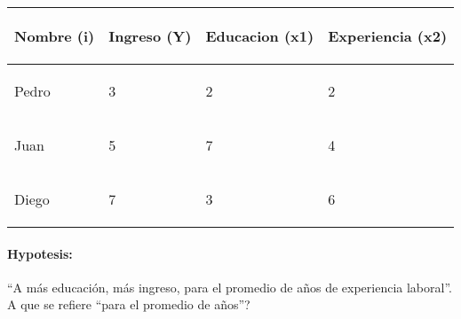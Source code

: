 \documentclass[10pt]{article}
\begin{document}
\begin{table}[!h]
        \centering
        
\begin{tabular}{|p{}|p{}|p{}|p{}|}
\hline 
 \begin{center}
\textbf{Nombre (i)}
\end{center}
 & \begin{center}
\textbf{Ingreso (Y)}
\end{center}
 & \begin{center}
\textbf{Educacion (x1)}
\end{center}
 & \begin{center}
\textbf{Experiencia (x2)}
\end{center}
 \\
\hline 
 \begin{center}
Pedro
\end{center}
 & \begin{center}
3
\end{center}
 & \begin{center}
2
\end{center}
 & \begin{center}
2
\end{center}
 \\
\hline 
 \begin{center}
Juan
\end{center}
 & \begin{center}
5
\end{center}
 & \begin{center}
7
\end{center}
 & \begin{center}
4
\end{center}
 \\
\hline 
 \begin{center}
Diego
\end{center}
 & \begin{center}
7
\end{center}
 & \begin{center}
3
\end{center}
 & \begin{center}
6
\end{center}
 \\
 \hline
\end{tabular}
        
        \end{table}


\paragraph{Hypotesis:} ``A m\'as educaci\'on, m\'as ingreso, para el promedio de a\~nos de experiencia laboral''. {\color{red}A que se refiere ``para el promedio de a\~nos''?}
\end{document}
